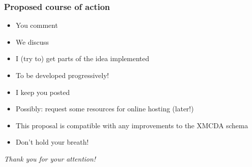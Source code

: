 \documentclass[french,english]{beamer}
\begin{document}
\begin{frame}
	\frametitle{Proposed course of action}
	\begin{itemize}
		\item You comment
		\item We discuss
		\item I (try to) get parts of the idea implemented
		\item To be developed progressively!
		\item I keep you posted
		\item Possibly: request some resources for online hosting (later!)
		\item This proposal is compatible with any improvements to the XMCDA schema
		\item Don’t hold your breath!
	\end{itemize}
\end{frame}

\begin{frame}[plain]
	\addtocounter{framenumber}{-1}
	\begin{center}
		\huge
		\textit{Thank you for your attention!}
	\end{center}
\end{frame}

\appendix
\AtBeginSection{
}
\end{document}
